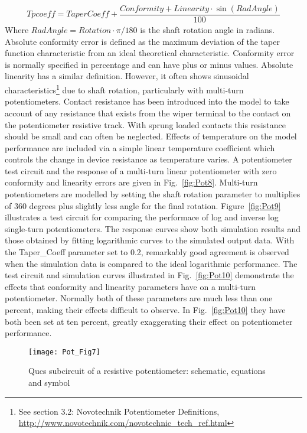 \begin{align}
\label{eq:pequ5}
Tpcoeff=TaperCoeff+\dfrac{Conformity+Linearity\cdot \sin{\left( RadAngle  \right)}}{100}
\end{align}
Where $ RadAngle = Rotation \cdot \pi/180$ is the shaft rotation angle
in radians. Absolute conformity error is defined as the maximum
deviation of the taper function characteristic from an ideal
theoretical characteristic. Conformity error is normally specified in
percentage and can have plus or minus values. Absolute linearity has a
similar definition. However, it often shows sinusoidal
characteristics\footnote{See section 3.2: Novotechnik Potentiometer
Definitions,
\url{http://www.novotechnik.com/novotechnic_tech_ref.html}} due to
shaft rotation, particularly with multi-turn potentiometers. Contact
resistance has been introduced into the model to take account of any
resistance that exists from the wiper terminal to the contact on the
potentiometer resistive track. With sprung loaded contacts this
resistance should be small and can often be neglected. Effects of
temperature on the model performance are included via a simple linear
temperature coefficient which controls the change in device resistance
as temperature varies. A potentiometer test circuit and the response
of a multi-turn linear potentiometer with zero conformity and
linearity errors are given in Fig.~\ref{fig:Pot8}. Multi-turn
potentiometers are modelled by setting the shaft rotation parameter to
multiplies of 360 degrees plus slightly less angle for the final
rotation. Figure~\ref{fig:Pot9} illustrates a test circuit for
comparing the performace of log and inverse log single-turn
potentiometers. The response curves show both simulation results and
those obtained by fitting logarithmic curves to the simulated output
data. With the Taper\_Coeff parameter set to 0.2, remarkably good
agreement is observed when the simulation data is compared to the
ideal logarithmic performance. The test circuit and simulation curves
illustrated in Fig.~\ref{fig:Pot10} demonstrate the effects that
conformity and linearity parameters have on a multi-turn
potentiometer.  Normally both of these parameters are much less than
one percent, making their effects difficult to observe.  In
Fig.~\ref{fig:Pot10} they have both been set at ten percent, greatly
exaggerating their effect on potentiometer performance.

\begin{figure} [here] 
  \centering
  \texttt{[image: Pot\_Fig7]}
  \caption{Qucs subcircuit of a resistive potentiometer: schematic, equations and symbol}
  \label{fig:Pot7}
\end{figure} 


